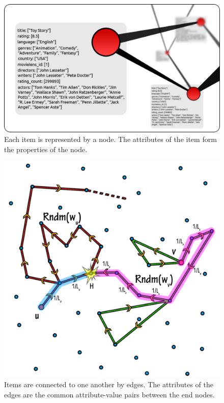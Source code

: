 \documentclass{acm_proc_article-sp}
\begin{document}
\begin{figure}[htp]
\centering
\includegraphics[scale=0.2]{Results/nodes.png}
\caption{Each item is represented by a node. The attributes of the item form the properties of the node.}
\label{node_G}
\end{figure}

\begin{figure}[htp]
\centering
\includegraphics[scale=0.05]{Results/LearningComponent.jpg}
\caption{Items are connected to one another by edges. The attributes of the edges are the common attribute-value pairs between the end nodes.}
\label{edge_G}
\end{figure}
\end{document}
